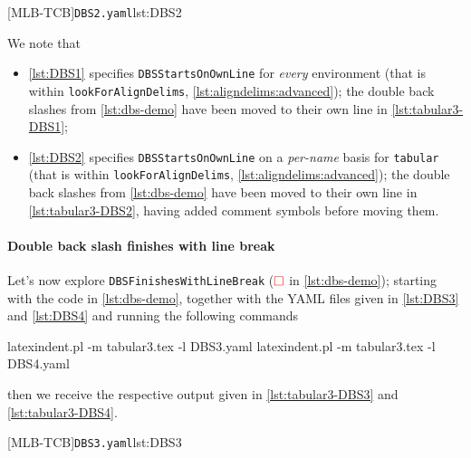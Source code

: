 		\begin{cmhtcbraster}[raster column skip=.01\linewidth]
			{\texttt{DBS2.yaml}}{lst:DBS2}
		\end{cmhtcbraster}

		We note that
		\begin{itemize}
			\item \cref{lst:DBS1} specifies \texttt{DBSStartsOnOwnLine} for
			      \emph{every} environment (that is within \texttt{lookForAlignDelims},
			      \vref{lst:aligndelims:advanced});
			      the double back slashes from \cref{lst:dbs-demo} have been moved to their own line in
			      \cref{lst:tabular3-DBS1};
			\item \cref{lst:DBS2} specifies \texttt{DBSStartsOnOwnLine} on a
			      \emph{per-name} basis for \texttt{tabular} (that is within \texttt{lookForAlignDelims},
			      \vref{lst:aligndelims:advanced});
			      the double back slashes from \cref{lst:dbs-demo} have been moved to their own line in
			      \cref{lst:tabular3-DBS2}, having added comment symbols before moving them.
		\end{itemize}

	\paragraph{Double back slash finishes with line break}
		Let's now explore \texttt{DBSFinishesWithLineBreak} ($\color{red}\square$ in
		\cref{lst:dbs-demo}); starting with the code in \cref{lst:dbs-demo}, together with the
		YAML files given in \cref{lst:DBS3} and \cref{lst:DBS4} and running the following
		commands   
		\begin{commandshell}
latexindent.pl -m tabular3.tex -l DBS3.yaml
latexindent.pl -m tabular3.tex -l DBS4.yaml
\end{commandshell}
		then we receive the respective output given in \cref{lst:tabular3-DBS3} and
		\cref{lst:tabular3-DBS4}.

		\begin{cmhtcbraster}[raster column skip=.01\linewidth]
			{\texttt{DBS3.yaml}}{lst:DBS3}
		\end{cmhtcbraster}

